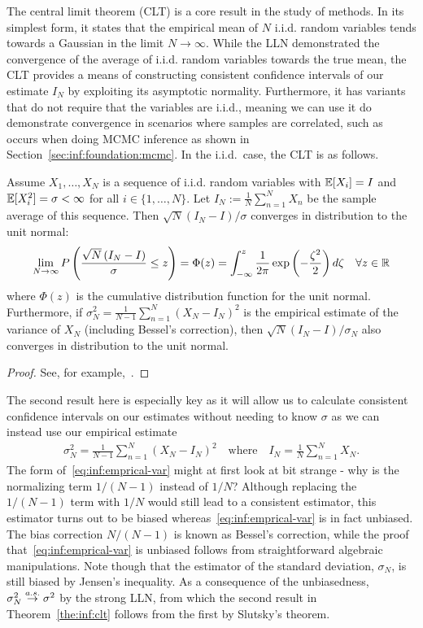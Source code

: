 The central limit theorem (CLT) is a core result in the study of \mc methods.  In its simplest form,
it states that the empirical mean of $N$ i.i.d. random variables tends towards a Gaussian in the limit $N\to\infty$.
While the LLN demonstrated the convergence of the average of i.i.d. random variables towards
the true mean, the CLT provides a means of constructing consistent confidence intervals of our estimate
$I_N$ by exploiting its asymptotic normality.  Furthermore, it has variants that do not
require that the variables are i.i.d., meaning we can use it do demonstrate convergence in scenarios
where samples are correlated, such as occurs when doing MCMC inference as shown in
Section~\ref{sec:inf:foundation:mcmc}.
In the i.i.d.~case, the CLT is as follows.
\begin{theorem}
	\label{the:inf:clt}
Assume $X_1,\dots,X_N$ is a sequence of i.i.d. random variables with 
$\mathbb{E} [X_i] = I$ and $\mathbb{E}[X_i^2]=\sigma<\infty$ for all  $i \in \{1,\dots,N\}$. Let 
$I_N := \frac{1}{N} \sum_{n=1}^{N} X_n$ be the
sample average of this sequence.  Then $\sqrt{N}\left(I_N-I\right)/\sigma$ converges
in distribution to the unit normal:
\begin{align}
\lim\limits_{N\rightarrow\infty} P\left(\frac{\sqrt{N}\left(I_N-I\right)}{\sigma} \le z\right)
=\Phi(z)= \int_{-\infty}^{z} \frac{1}{2\pi} \exp\left(-\frac{\zeta^2}{2}\right) d\zeta \quad \forall z\in\mathbb{R}
\end{align}
where $\Phi(z)$ is the cumulative distribution function for the unit normal.
Furthermore, if $\sigma_N^2 = \frac{1}{N-1} \sum_{n=1}^{N} \left(X_N-I_N\right)^2$ is
the empirical estimate of the variance of $X_N$ (including Bessel's correction), then
$\sqrt{N}\left(I_N-I\right)/\sigma_N$ also converges
in distribution to the unit normal.
\end{theorem}
\begin{proof}
	See, for example,~\cite[Chapter 3]{durrett2010probability}.
\end{proof}
\noindent The second result here is especially key as it will allow us to calculate consistent confidence intervals
on our estimates without needing to know $\sigma$ as we can instead use our empirical estimate
\begin{align}
	\label{eq:inf:emprical-var}
	\sigma_N^2 = \frac{1}{N-1} \sum_{n=1}^{N} \left(X_N-I_N\right)^2 \quad \mathrm{where} 
	\quad I_N = \frac{1}{N}\sum_{n=1}^{N}X_N.
\end{align}
The form of~\eqref{eq:inf:emprical-var} might at first look at bit strange - why is the normalizing
term $1/(N-1)$ instead of $1/N$?  Although replacing the $1/(N-1)$ term with $1/N$ would still lead
to a consistent estimator, this estimator turns out to be biased whereas~\eqref{eq:inf:emprical-var}
is in fact unbiased.  The bias correction $N/(N-1)$ is known as Bessel's correction, while the proof
that~\eqref{eq:inf:emprical-var} is unbiased follows from straightforward algebraic manipulations.
Note though that the estimator of the standard deviation, $\sigma_N$, is still biased by Jensen's
inequality.
As a consequence of the unbiasedness, $\sigma_N^2 \overset{a.s.}{\to} \sigma^2$ by the strong LLN, 
from which the second result
in Theorem~\ref{the:inf:clt} follows from the first by Slutsky's theorem.

